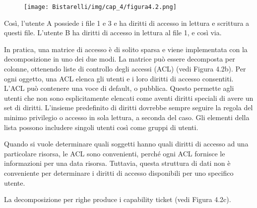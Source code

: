 \begin{figure}[H]
	\centering
    \texttt{[image: Bistarelli/img/cap\_4/figura4.2.png]}
\end{figure}

Così, l'utente A possiede i file 1 e 3 e ha diritti di accesso in lettura e scrittura a questi file. L'utente B ha diritti di accesso in lettura al file 1, e così via.

\singlespacing

In pratica, una matrice di accesso è di solito sparsa e viene implementata con la decomposizione in uno dei due modi. La matrice può essere decomposta per colonne, ottenendo liste di controllo degli accessi (ACL) (vedi Figura 4.2b). Per ogni oggetto, una ACL elenca gli utenti e i loro diritti di accesso consentiti. L'ACL può contenere una voce di default, o pubblica. Questo permette agli utenti che non sono esplicitamente elencati come aventi diritti speciali di avere un set di diritti. L'insieme predefinito di diritti dovrebbe sempre seguire la regola del minimo privilegio o accesso in sola lettura, a seconda del caso. Gli elementi della lista possono includere singoli utenti così come gruppi di utenti.

\singlespacing

Quando si vuole determinare quali soggetti hanno quali diritti di accesso ad una particolare risorsa, le ACL sono convenienti, perché ogni ACL fornisce le informazioni per una data risorsa. Tuttavia, questa struttura di dati non è conveniente per determinare i diritti di accesso disponibili per uno specifico utente.

\singlespacing

La decomposizione per righe produce i capability ticket (vedi Figura 4.2c).

\singlespacing

